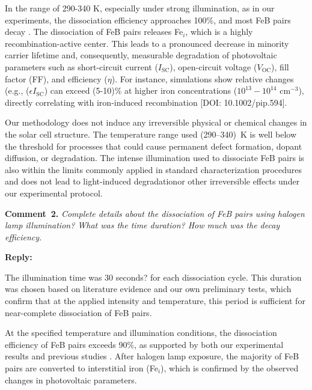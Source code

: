 \documentclass[a4paper,fleqn]{cas-sc}
\begin{document}
In the range of 290-340 K, especially under strong illumination, as in our experiments, the dissociation efficiency approaches 100\%, and most FeB pairs decay \cite{istratov1999}. 
The dissociation of FeB pairs releases Fe$_i$, which is a highly recombination-active center. 
This leads to a pronounced decrease in minority carrier lifetime and, consequently, measurable degradation of photovoltaic parameters such as short-circuit current ($I_\mathrm{SC}$), open-circuit voltage ($V_\mathrm{OC}$), fill factor (FF), and efficiency ($\eta$). 
For instance, simulations show relative changes (e.g., ($\epsilon I_\mathrm{SC}$) can exceed (5-10)\% at higher iron concentrations ($10^{13} - 10^{14}$ cm$^{-3}$), directly correlating with iron-induced recombination [DOI: 10.1002/pip.594].

Our methodology does not induce any irreversible physical or chemical changes in the solar cell structure. 
The temperature range used (290–340)~K is well below the threshold for processes that could cause permanent defect formation, dopant diffusion, or degradation. 
The intense illumination used to dissociate FeB pairs is also within the limits commonly applied in standard characterization procedures and does not lead to light-induced degradationor other irreversible effects under our experimental protocol.



\vspace{1cm}
\noindent
\textcolor[rgb]{0.00,0.50,1.00}{\textbf{Comment~2.}}
\emph{Complete details about the dissociation of FeB pairs using halogen lamp illumination? What was the time duration? How much was the decay efficiency.}

\noindent
\textcolor[rgb]{0.51,0.00,0.00}{\textbf{Reply:}}


The illumination time was 30 seconds? for each dissociation cycle. 
This duration was chosen based on literature evidence and our own preliminary tests, which confirm that at the applied intensity and temperature, this period is sufficient for near-complete dissociation of FeB pairs.


At the specified temperature and illumination conditions, the dissociation efficiency of FeB pairs exceeds 90\%, as supported by both our experimental results and previous studies \cite{geerligs2004}. 
After halogen lamp exposure, the majority of FeB pairs are converted to interstitial iron (Fe$_i$), which is confirmed by the observed changes in photovoltaic parameters.
\end{document}
